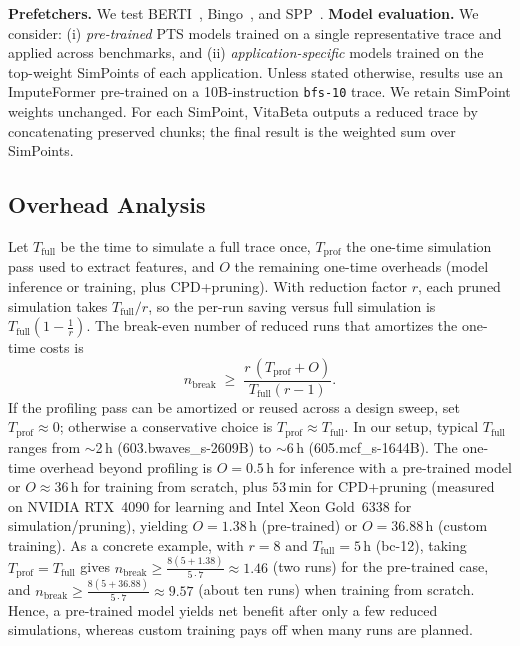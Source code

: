 \textbf{Prefetchers.} We test BERTI~\cite{navarro2022berti}, Bingo~\cite{bingo}, and SPP~\cite{spp}.
\textbf{Model evaluation.} 
We consider:
(i) \emph{pre-trained} PTS models trained on a single representative trace and applied across benchmarks, and
(ii) \emph{application-specific} models trained on the top-weight SimPoints of each application. Unless stated otherwise, results use an ImputeFormer pre-trained on a 10B-instruction \texttt{bfs-10} trace.
We retain SimPoint weights unchanged. For each SimPoint, VitaBeta outputs a reduced trace by concatenating preserved chunks; the final result is the weighted sum over SimPoints.
\subsection{Overhead Analysis}
\label{subsec:overhead}
Let $T_{\text{full}}$ be the time to simulate a full trace once, $T_{\text{prof}}$ the one-time simulation pass used to extract features, and $O$ the remaining one-time overheads (model inference or training, plus CPD+pruning). With reduction factor $r$, each pruned simulation takes $T_{\text{full}}/r$, so the per-run saving versus full simulation is $T_{\text{full}}\!\left(1-\frac{1}{r}\right)$. The break-even number of reduced runs that amortizes the one-time costs is
\begin{equation}
\label{eq:breakeven}
n_{\text{break}} \;\ge\; \frac{r\,(T_{\text{prof}} + O)}{T_{\text{full}}(r-1)}.
\end{equation}
If the profiling pass can be amortized or reused across a design sweep, set $T_{\text{prof}}\!\approx\!0$; otherwise a conservative choice is $T_{\text{prof}}\!\approx\!T_{\text{full}}$. In our setup, typical $T_{\text{full}}$ ranges from $\sim$2\,h (603.bwaves\_s-2609B) to $\sim$6\,h (605.mcf\_s-1644B). 
The one-time overhead beyond profiling is $O{=}0.5$\,h for inference with a pre-trained model or $O{\approx}36$\,h for training from scratch, plus $53$\,min for CPD+pruning (measured on NVIDIA RTX~4090 for learning and Intel Xeon Gold~6338 for simulation/pruning), yielding $O{=}1.38$\,h (pre-trained) or $O{=}36.88$\,h (custom training). As a concrete example, with $r{=}8$ and $T_{\text{full}}{=}5$\,h (bc-12), taking $T_{\text{prof}}{=}T_{\text{full}}$ gives
$n_{\text{break}} \!\ge\! \tfrac{8(5+1.38)}{5\cdot7}\!\approx\!1.46$ (two runs) for the pre-trained case, and
$n_{\text{break}} \!\ge\! \tfrac{8(5+36.88)}{5\cdot7}\!\approx\!9.57$ (about ten runs) when training from scratch. Hence, a pre-trained model yields net benefit after only a few reduced simulations, whereas custom training pays off when many runs are planned.

